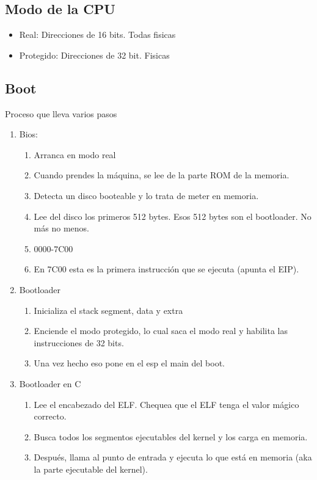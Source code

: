 \documentclass{article}
\begin{document}
\subsection{Modo de la CPU}\label{modo-de-la-cpu}

\begin{itemize}
\item
  Real: Direcciones de 16 bits. Todas fisicas
\item
  Protegido: Direcciones de 32 bit. Fisicas
\end{itemize}

\subsection{Boot}\label{boot}

Proceso que lleva varios pasos

\begin{enumerate}
\def\labelenumi{\arabic{enumi}.}
\item
  Bios:

  \begin{enumerate}
  \def\labelenumii{\alph{enumii}.}
  \item
    Arranca en modo real
  \item
    Cuando prendes la máquina, se lee de la parte ROM de la memoria.
  \item
    Detecta un disco booteable y lo trata de meter en memoria.
  \item
    Lee del disco los primeros 512 bytes. Esos 512 bytes son el
    bootloader. No más no menos.
  \item
    0000-7C00
  \item
    En 7C00 esta es la primera instrucción que se ejecuta (apunta el
    EIP).
  \end{enumerate}
\item
  Bootloader

  \begin{enumerate}
  \def\labelenumii{\alph{enumii}.}
  \item
    Inicializa el stack segment, data y extra
  \item
    Enciende el modo protegido, lo cual saca el modo real y habilita las
    instrucciones de 32 bits.
  \item
    Una vez hecho eso pone en el esp el main del boot.
  \end{enumerate}
\item
  Bootloader en C

  \begin{enumerate}
  \def\labelenumii{\alph{enumii}.}
  \item
    Lee el encabezado del ELF. Chequea que el ELF tenga el valor mágico
    correcto.
  \item
    Busca todos los segmentos ejecutables del kernel y los carga en
    memoria.
  \item
    Después, llama al punto de entrada y ejecuta lo que está en memoria
    (aka la parte ejecutable del kernel).
  \end{enumerate}
\end{enumerate}
\end{document}
